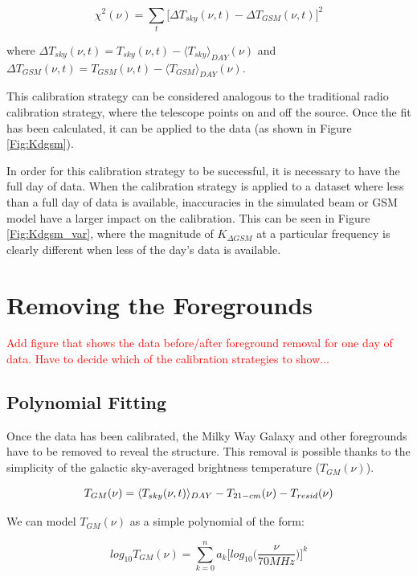 \begin{equation}
\chi^2(\nu) =  \sum_t \big [ \Delta T_{sky}(\nu,t) - \Delta T_{GSM}(\nu,t) \big ]^2
\end{equation}

where $\Delta T_{sky} (\nu, t) = T_{sky}(\nu,t)-\langle T_{sky} \rangle_{DAY} (\nu)$ and $\Delta T_{GSM} (\nu,t) = T_{GSM}(\nu,t)-\langle T_{GSM} \rangle_{DAY} (\nu)$. 

This calibration strategy can be considered analogous to the traditional radio calibration strategy, where the telescope points on and off the source. Once the fit has been calculated, it can be applied to the data (as shown in Figure \ref{Fig:Kdgsm}). 


In order for this calibration strategy to be successful, it is necessary to have the full day of data. When the calibration strategy is applied to a dataset where less than a full day of data is available, inaccuracies in the simulated beam or GSM model have a larger impact on the calibration. This can be seen in Figure \ref{Fig:Kdgsm_var}, where the magnitude of $K_{\Delta GSM}$ at a particular frequency is clearly different when less of the day's data is available. 

\section{Removing the Foregrounds}

\textcolor{red}{Add figure that shows the data before/after foreground removal for one day of data. Have to decide which of the calibration strategies to show...}

\subsection{Polynomial Fitting}
Once the data has been calibrated, the Milky Way Galaxy and other foregrounds have to be removed to reveal the \cm structure. This removal is possible thanks to the simplicity of the galactic sky-averaged brightness temperature ($T_{GM}(\nu)$). 

\begin{equation}
T_{GM}(\nu) = \langle T_{sky}(\nu,t) \rangle_{DAY} - T_{21-cm} (\nu) - T_{resid} (\nu)
\end{equation}

We can model $T_{GM} (\nu)$ as a simple polynomial of the form:

\begin{equation}
log_{10} T_{GM}(\nu) = \sum_{k=0}^n a_k \Big[ log_{10} \Big(\frac{\nu}{70 MHz}\Big) \Big]^k
\end{equation}

